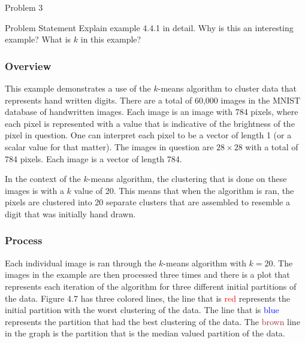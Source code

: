 \begin{problem}{Problem 3}
    \begin{statement}{Problem Statement}
        Explain example 4.4.1 in detail. Why is this an interesting example? What is $k$ in this example?
    \end{statement}

    \begin{highlight}[Solution]
        \subsubsection*{Overview}

        This example demonstrates a use of the $k$-means algorithm to cluster data that represents hand written digits. There are a total of 60,000 images in the MNIST database of handwritten images.
        Each image is an image with 784 pixels, where each pixel is represented with a value that is indicative of the brightness of the pixel in question. One can interpret each pixel to be a vector
        of length 1 (or a scalar value for that matter). The images in question are $28 \times 28$ with a total of 784 pixels. Each image is a vector of length 784.

        In the context of the $k$-means algorithm, the clustering that is done on these images is with a $k$ value of 20. This means that when the algorithm is ran, the pixels are clustered into 20
        separate clusters that are assembled to resemble a digit that was initially hand drawn. \vspace*{1em}

        \subsubsection*{Process}

        Each individual image is ran through the $k$-means algorithm with $k = 20$. The images in the example are then processed three times and there is a plot that represents each iteration of the
        algorithm for three different initial partitions of the data. Figure 4.7 has three colored lines, the line that is \textcolor{red}{red} represents the initial partition with the worst clustering
        of the data. The line that is \textcolor{blue}{blue} represents the partition that had the best clustering of the data. The \textcolor{brown}{brown} line in the graph is the partition that is
        the median valued partition of the data. \vspace*{1em}


\end{highlight}
\end{problem}
